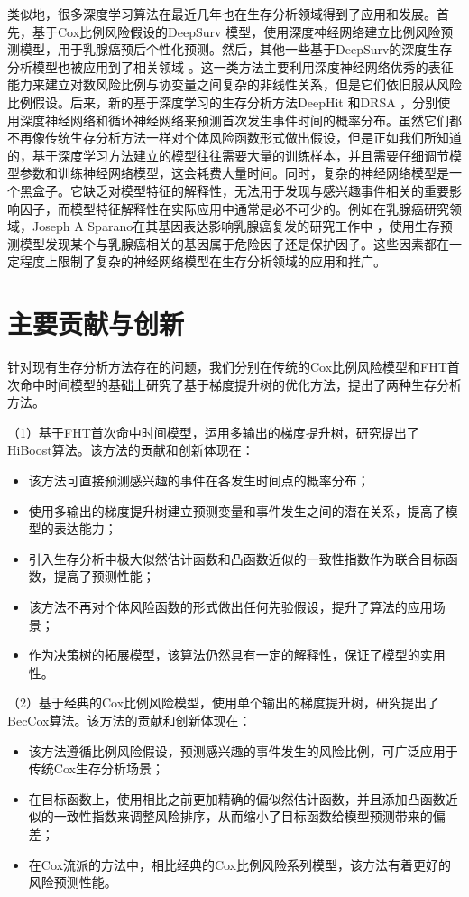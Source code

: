 类似地，很多深度学习算法在最近几年也在生存分析领域得到了应用和发展。首先，基于Cox比例风险假设的DeepSurv 模型，使用深度神经网络建立比例风险预测模型，用于乳腺癌预后个性化预测。然后，其他一些基于DeepSurv的深度生存分析模型也被应用到了相关领域 。这一类方法主要利用深度神经网络优秀的表征能力来建立对数风险比例与协变量之间复杂的非线性关系，但是它们依旧服从风险比例假设。后来，新的基于深度学习的生存分析方法DeepHit 和DRSA ，分别使用深度神经网络和循环神经网络来预测首次发生事件时间的概率分布。虽然它们都不再像传统生存分析方法一样对个体风险函数形式做出假设，但是正如我们所知道的，基于深度学习方法建立的模型往往需要大量的训练样本，并且需要仔细调节模型参数和训练神经网络模型，这会耗费大量时间。同时，复杂的神经网络模型是一个黑盒子。它缺乏对模型特征的解释性，无法用于发现与感兴趣事件相关的重要影响因子，而模型特征解释性在实际应用中通常是必不可少的。例如在乳腺癌研究领域，Joseph A Sparano在其基因表达影响乳腺癌复发的研究工作中 ，使用生存预测模型发现某个与乳腺癌相关的基因属于危险因子还是保护因子。这些因素都在一定程度上限制了复杂的神经网络模型在生存分析领域的应用和推广。

\section{主要贡献与创新}

针对现有生存分析方法存在的问题，我们分别在传统的Cox比例风险模型和FHT首次命中时间模型的基础上研究了基于梯度提升树的优化方法，提出了两种生存分析方法。

（1）基于FHT首次命中时间模型，运用多输出的梯度提升树，研究提出了HiBoost算法。该方法的贡献和创新体现在：
\begin{itemize}
    \item 该方法可直接预测感兴趣的事件在各发生时间点的概率分布；
    \item 使用多输出的梯度提升树建立预测变量和事件发生之间的潜在关系，提高了模型的表达能力；
    \item 引入生存分析中极大似然估计函数和凸函数近似的一致性指数作为联合目标函数，提高了预测性能；
    \item 该方法不再对个体风险函数的形式做出任何先验假设，提升了算法的应用场景；
    \item 作为决策树的拓展模型，该算法仍然具有一定的解释性，保证了模型的实用性。
\end{itemize}

（2）基于经典的Cox比例风险模型，使用单个输出的梯度提升树，研究提出了BecCox算法。该方法的贡献和创新体现在：
\begin{itemize}
    \item 该方法遵循比例风险假设，预测感兴趣的事件发生的风险比例，可广泛应用于传统Cox生存分析场景；
    \item 在目标函数上，使用相比之前更加精确的偏似然估计函数，并且添加凸函数近似的一致性指数来调整风险排序，从而缩小了目标函数给模型预测带来的偏差；
    \item 在Cox流派的方法中，相比经典的Cox比例风险系列模型，该方法有着更好的风险预测性能。
\end{itemize}

